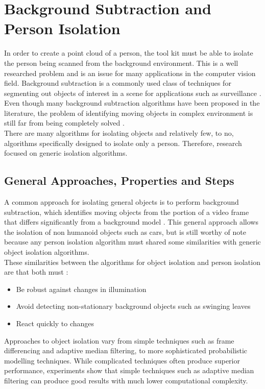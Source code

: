 \section{Background Subtraction and Person Isolation}
\label{background subtraction and person isolation}
In order to create a point cloud of a person, the tool kit must be able to isolate the person being scanned from the background environment. This is a well researched problem and is an issue for many applications in the computer vision field. Background subtraction is a commonly used class of techniques for segmenting out objects of interest in a scene for applications such as surveillance \cite{McIvor2000}. Even though many background subtraction algorithms have been proposed in the literature, the problem of identifying moving objects in complex environment is still far from being completely solved \cite{Cheung2007}.\\

There are many algorithms for isolating objects and relatively few, to no, algorithms specifically designed to isolate only a person. Therefore, research focused on generic isolation algorithms.\\

\subsection{General Approaches, Properties and Steps}
A common approach for isolating general objects is to perform background subtraction, which identifies moving objects from the portion of a video frame that differs significantly from a background model \cite{Cheung2007}.
This general approach allows the isolation of non humanoid objects such as cars, but is still worthy of note because any person isolation algorithm must shared some similarities with generic object isolation algorithms.\\

These similarities between the algorithms for object isolation and person isolation are that both must \cite{Cheung2007}:\begin{itemize}
  \item Be robust against changes in illumination
  \item Avoid detecting non-stationary background objects such as swinging leaves
  \item React quickly to changes
\end{itemize}

Approaches to object isolation vary from simple techniques such as frame differencing and adaptive median filtering, to more sophisticated probabilistic modelling techniques. 
While complicated techniques often produce superior performance, experiments \cite{Cheung2007} show that simple techniques such as adaptive median filtering can produce good results with much lower computational complexity.\\

